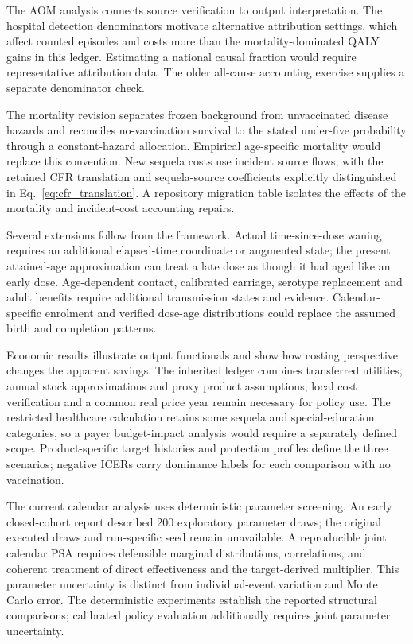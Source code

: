 \documentclass[10pt,letterpaper]{article}
\begin{document}
The AOM analysis connects source verification to output interpretation. The hospital detection denominators motivate alternative attribution settings, which affect counted episodes and costs more than the mortality-dominated QALY gains in this ledger. Estimating a national causal fraction would require representative attribution data. The older all-cause accounting exercise supplies a separate denominator check.

The mortality revision separates frozen background from unvaccinated disease hazards and reconciles no-vaccination survival to the stated under-five probability through a constant-hazard allocation. Empirical age-specific mortality would replace this convention. New sequela costs use incident source flows, with the retained CFR translation and sequela-source coefficients explicitly distinguished in Eq.~\ref{eq:cfr_translation}. A repository migration table isolates the effects of the mortality and incident-cost accounting repairs.

Several extensions follow from the framework. Actual time-since-dose waning requires an additional elapsed-time coordinate or augmented state; the present attained-age approximation can treat a late dose as though it had aged like an early dose. Age-dependent contact, calibrated carriage, serotype replacement and adult benefits require additional transmission states and evidence. Calendar-specific enrolment and verified dose-age distributions could replace the assumed birth and completion patterns.

Economic results illustrate output functionals and show how costing perspective changes the apparent savings. The inherited ledger combines transferred utilities, annual stock approximations and proxy product assumptions; local cost verification and a common real price year remain necessary for policy use. The restricted healthcare calculation retains some sequela and special-education categories, so a payer budget-impact analysis would require a separately defined scope. Product-specific target histories and protection profiles define the three scenarios; negative ICERs carry dominance labels for each comparison with no vaccination.

The current calendar analysis uses deterministic parameter screening. An early closed-cohort report described 200 exploratory parameter draws; the original executed draws and run-specific seed remain unavailable. A reproducible joint calendar PSA requires defensible marginal distributions, correlations, and coherent treatment of direct effectiveness and the target-derived multiplier. This parameter uncertainty is distinct from individual-event variation and Monte Carlo error. The deterministic experiments establish the reported structural comparisons; calibrated policy evaluation additionally requires joint parameter uncertainty.
\end{document}

